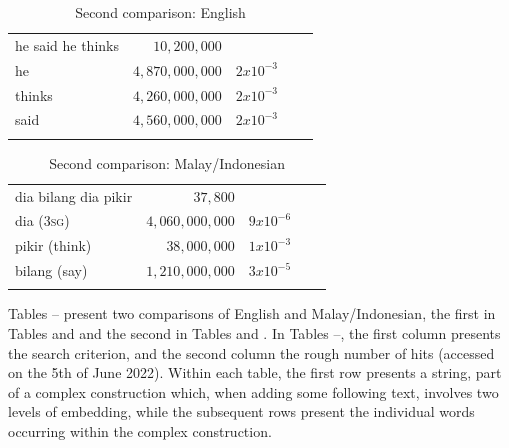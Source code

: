 \documentclass[output=paper,colorlinks,citecolor=brown
]{langscibook}
\begin{document}
\begin{table}
\caption{Second comparison: English}
\label{tab:second-english}
 \begin{tabularx}{.8\textwidth}{X rrrr}
 \lsptoprule
 he said he thinks & $10,200,000$ & {} \\
 he & $4,870,000,000$ & $2 x 10^{-3}$ \\
 thinks & $4,260,000,000$ & $2 x 10^{-3}$\\
 said & $4,560,000,000$ & $2 x 10^{-3}$\\
 \lspbottomrule
 \end{tabularx}
\end{table}

\begin{table}
\caption{Second comparison: Malay/Indonesian}
\label{tab:second-malay}
 \begin{tabularx}{.8\textwidth}{X rrrr}
 \lsptoprule
 dia bilang dia pikir & $37,800$ & {} \\
 dia (3\textsc{sg}) & $4,060,000,000$ & $9 x 10^{-6}$ \\
 pikir (think) & $38,000,000$ & $1 x 10^{-3}$\\
 bilang (say) & $1,210,000,000$ & $3 x 10^{-5}$\\
 \lspbottomrule
 \end{tabularx}
\end{table}

Tables -- present two comparisons of English and Malay/Indonesian, the first in Tables  and  and the second in Tables  and .  In Tables --, the first column presents the search criterion, and the second column the rough number of hits (accessed on the 5th of June 2022).  Within each table, the first row presents a string, part of a complex construction which, when adding some following text, involves two levels of embedding, while the subsequent rows present the individual words occurring within the complex construction.
\end{document}
